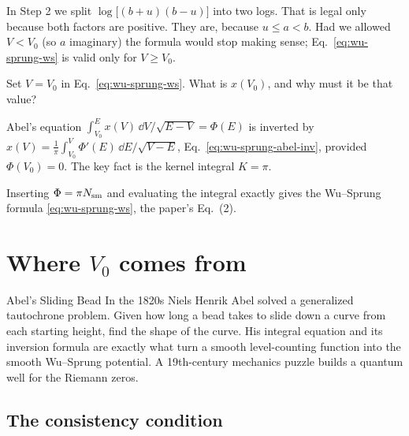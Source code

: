 \begin{pitfall}
In Step 2 we split $\log\bigl[(b+u)(b-u)\bigr]$ into two logs. That is legal only because both factors are positive. They are, because $u\le a<b$. Had we allowed $V<V_0$ (so $a$ imaginary) the formula would stop making sense; Eq.~\eqref{eq:wu-sprung-ws} is valid only for $V\ge V_0$.
\end{pitfall}

\begin{checkpoint}
Set $V=V_0$ in Eq.~\eqref{eq:wu-sprung-ws}. What is $x(V_0)$, and why must it be that value?
\end{checkpoint}

\begin{keyideas}
\item Abel's equation $\int_{V_0}^{E}x(V)\,\dd V/\sqrt{E-V}=\Phi(E)$ is inverted by $x(V)=\frac1\pi\int_{V_0}^{V}\Phi'(E)\,\dd E/\sqrt{V-E}$, Eq.~\eqref{eq:wu-sprung-abel-inv}, provided $\Phi(V_0)=0$. The key fact is the kernel integral $K=\pi$.
\item Inserting $\Phi=\pi N_{\mathrm{sm}}$ and evaluating the integral exactly gives the Wu--Sprung formula \eqref{eq:wu-sprung-ws}, the paper's Eq.~(2).
\end{keyideas}

\section{Where $V_0$ comes from}\label{sec:wu-sprung-v0}
\begin{didyouknow}{Abel's Sliding Bead}
In the 1820s Niels Henrik Abel solved a generalized tautochrone problem. Given how long a bead takes to slide down a curve from each starting height, find the shape of the curve. His integral equation and its inversion formula are exactly what turn a smooth level-counting function into the smooth Wu--Sprung potential. A 19th-century mechanics puzzle builds a quantum well for the Riemann zeros.
\end{didyouknow}

\subsection{The consistency condition}

